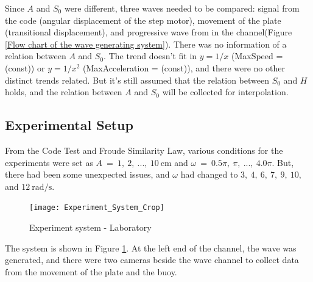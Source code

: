 Since $A$ and $S_{0}$ were different, three waves needed to be compared: signal from the code (angular displacement of the step motor), movement of the plate (transitional displacement), and progressive wave from in the channel(Figure \ref{Flow chart of the wave generating system}). There was no information of a relation between $A$ and $S_{0}$. The trend doesn't fit in $y=1/x$ (MaxSpeed = (const)) or $y=1/x^{2}$ (MaxAcceleration = (const)), and there were no other distinct trends related. But it's still assumed that the relation between $S_{0}$ and $H$ holds, and the relation between $A$ and $S_{0}$ will be collected for interpolation.

\subsection{Experimental Setup}
From the Code Test and Froude Similarity Law, various conditions for the experiments were set as $A~=~1,~2,~...,~10\mathrm{~cm}$ and $\omega~=~0.5\pi,~\pi,~...,~4.0\pi$. But, there had been some unexpected issues, and $\omega$ had changed to $3,~4,~6,~7,~9,~10,$ and $12\mathrm{~rad/s}$.


\begin{figure}[H]
    \begin{center}
        \texttt{[image: Experiment\_System\_Crop]}
    \end{center}
        \caption{Experiment system - Laboratory}
        \label{Experimnet_System} 
\end{figure}


The system is shown in Figure \ref{Experimnet_System}. At the left end of the channel, the wave was generated, and there were two cameras beside the wave channel to collect data from the movement of the plate and the buoy.